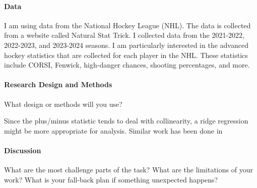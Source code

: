 \documentclass[12pt]{article}
\begin{document}
\paragraph{Data}

I am using data from the National Hockey League (NHL). The data is collected from a website called Natural Stat Trick. 
I collected data from the 2021-2022, 2022-2023, and 2023-2024 seasons. I am particularly interested in the advanced hockey 
statistics that are collected for each player in the NHL. These statistics include CORSI, Fenwick, high-danger chances,
shooting percentages, and more.

\paragraph{Research Design and Methods}
What design or methods will you use?

Since the plus/minus statistic tends to deal with collinearity, a ridge regression might be more
appropriate for analysis. Similar work has been done in \cite{Macdonald_2012}


\paragraph{Discussion}
What are the most challenge parts of the task?
What are the limitations of your work? What is your fall-back plan if
something unexpected happens?




\end{document}
